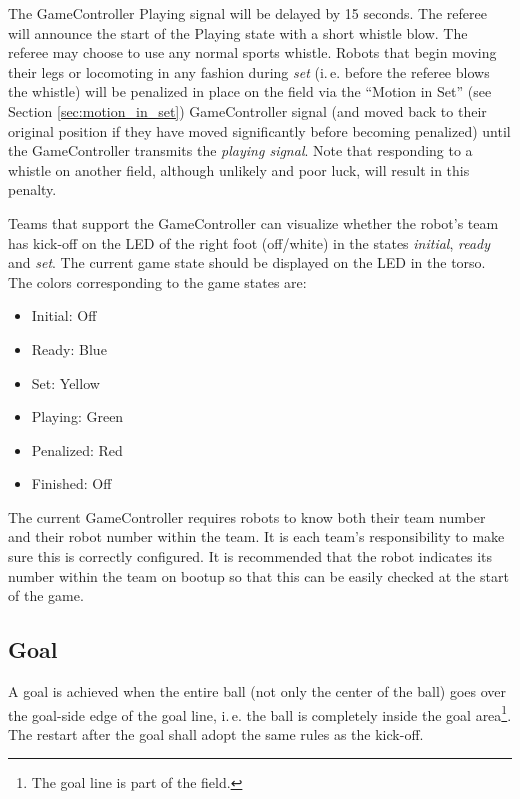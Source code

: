 \documentclass[12pt]{article}
\newcommand{\ie}{\mbox{i.\,e.}\xspace}
\begin{document}
The GameController Playing signal will be delayed by 15 seconds.  The referee will announce the start of the Playing state with a short whistle blow.  The referee may choose to use any normal sports whistle.  Robots that begin moving their legs or locomoting in any fashion during \emph{set} (\ie before the referee blows the whistle) will be penalized in place on the field via the ``Motion in Set'' (see Section \ref{sec:motion_in_set}) GameController signal (and moved back to their original position if they have moved significantly before becoming penalized) until the GameController transmits the \emph{playing signal}.  Note that responding to a whistle on another field, although unlikely and poor luck, will result in this penalty.

Teams that support the GameController can visualize whether the robot's team has kick-off on the LED of the right foot (off/white) in the states \emph{initial}, \emph{ready} and \emph{set}. The current game state should be displayed on the LED in the torso. The colors corresponding to the game states are:

\begin{itemize}

\item Initial: Off

\item Ready: Blue

\item Set: Yellow

\item Playing: Green

\item Penalized: Red

\item Finished: Off

\end{itemize}

The current GameController requires robots to know both their team number and their robot number within the team. It is each team's responsibility to make sure this is correctly configured. It is recommended that the robot indicates its number within the team on bootup so that this can be easily checked at the start of the game.

\subsection{Goal}
\label{sec:goal}
A goal is achieved when the entire ball (not only the center of the ball) goes over the goal-side edge of the goal line, \ie the ball is completely inside the goal area\footnote{The goal line is part of the field.}. The restart after the goal shall adopt the same rules as the kick-off.
\end{document}
